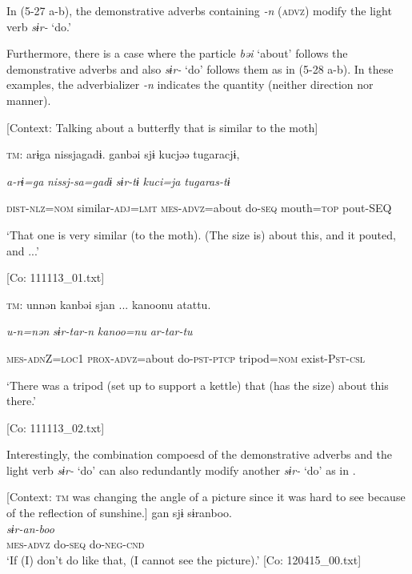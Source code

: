 In (5-27 a-b), the demonstrative adverbs containing \textit{{}-n} (\textsc{advz}) modify the light verb \textit{sɨr-} ‘do.’

Furthermore, there is a case where the particle \textit{bəi} ‘about’ follows the demonstrative adverbs and also \textit{sɨr-} ‘do’ follows them as in (5-28 a-b). In these examples, the adverbializer \textit{{}-n} indicates the quantity (neither direction nor manner).

\ea \label{ex:5:28}  \ea \label{ex:5:28a} [Context: Talking about a butterfly that is similar to the moth]

    \textsc{tm}:  arɨga  nissjagadɨ.  ganbəi  sjɨ  kucjəə  tugaracjɨ,

      \textit{a-rɨ=ga}  \textit{nissj-sa=gadɨ}  \textit{}  \textit{sɨr-tɨ}  \textit{kuci=ja}  \textit{tugaras-tɨ}
                                                                                   
      \textsc{dist}-\textsc{nlz}=\textsc{nom}  similar-\textsc{adj}=\textsc{lmt}  \textsc{mes}-\textsc{advz}=about  do-\textsc{seq}     mouth=\textsc{top}  pout-SEQ

      ‘That one is very similar (to the moth). (The size is) about this, and it pouted, and ...’

      [Co: 111113\_01.txt]

 \ex \label{ex:5:b} \textsc{tm}:  unnən  kanbəi  sjan  ...   kanoonu  atattu.
                                                               
      \textit{u-n=nən}  \textit{}  \textit{sɨr-tar-n} \textit{kanoo=nu}  \textit{ar-tar-tu}     
                                                              
      \textsc{mes}-\textsc{adn}Z=\textsc{loc}1  \textsc{prox}-\textsc{advz}=about  do-\textsc{pst}-\textsc{ptcp}   tripod=\textsc{nom}  exist-P\textsc{st}-\textsc{csl}

      ‘There was a tripod (set up to support a kettle) that (has the size) about this there.’

      [Co: 111113\_02.txt]
\z
\z

Interestingly, the combination compoesd of the demonstrative adverbs and the light verb \textit{sɨr-} ‘do’ can also redundantly modify another \textit{sɨr-} ‘do’ as in .

\ea \label{ex:5:29}   [Context: \textsc{tm} was changing the angle of a picture since it was hard to see because of the reflection of sunshine.]
\glll  gan  sjɨ  sɨranboo.\\
\textit{}  \textit{}  \textit{sɨr-an-boo}\\
\textsc{mes}-\textsc{advz}  do-\textsc{seq}  do-\textsc{neg}-\textsc{cnd}\\
\glt ‘If (I) don’t do like that, (I cannot see the picture).’ [Co: 120415\_00.txt]
\z

